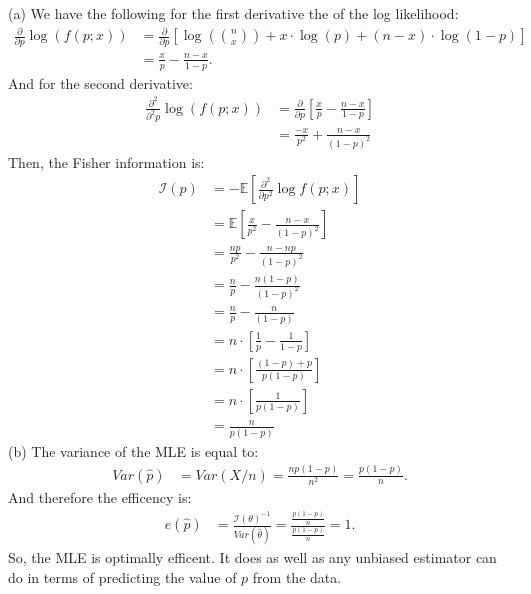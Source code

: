 (a) We have the following for the first derivative the of the log likelihood:
\begin{align*}
\frac{\partial}{\partial p} \log(f(p; x))
&= \frac{\partial}{\partial p} \left[ \log(\binom{n}{x}) +  x \cdot \log(p) + (n-x) \cdot \log(1-p) \right] \\
&= \frac{x}{p} - \frac{n-x}{1-p}.
\end{align*}
And for the second derivative:
\begin{align*}
\frac{\partial^2}{\partial^2 p} \log(f(p; x))
&= \frac{\partial}{\partial p} \left[ \frac{x}{p} - \frac{n-x}{1-p} \right] \\
&= \frac{-x}{p^2} + \frac{n-x}{(1-p)^2}
\end{align*}
Then, the Fisher information is:
\begin{align*}
\mathcal{I}(p) &= - \mathbb{E} \left[ \frac{\partial^2}{\partial p^2} \log f(p; x) \right] \\
&= \mathbb{E} \left[ \frac{x}{p^2} - \frac{n-x}{(1-p)^2} \right] \\
&= \frac{np}{p^2} - \frac{n-np}{(1-p)^2} \\
&= \frac{n}{p} - \frac{n(1-p)}{(1-p)^2} \\
&= \frac{n}{p} - \frac{n}{(1-p)} \\
&= n \cdot \left[ \frac{1}{p} - \frac{1}{1-p} \right] \\
&= n \cdot \left[ \frac{(1 - p) + p}{p (1 - p)} \right] \\
&= n \cdot \left[ \frac{1}{p (1 - p)} \right] \\
&= \frac{n}{p (1 - p)}
\end{align*}
(b) The variance of the MLE is equal to:
\begin{align*}
Var(\hat{p}) &= Var(X/n) = \frac{np(1-p)}{n^2} = \frac{p(1-p)}{n}.
\end{align*}
And therefore the efficency is:
\begin{align*}
e(\hat{p}) &= \frac{\mathcal{I}(\theta)^{-1}}{Var(\widehat{\theta})} = \frac{\frac{p (1 - p)}{n}}{\frac{p(1-p)}{n}} = 1.
\end{align*}
So, the MLE is optimally efficent. It does as well as any unbiased estimator can do in
terms of predicting the value of $p$ from the data.






